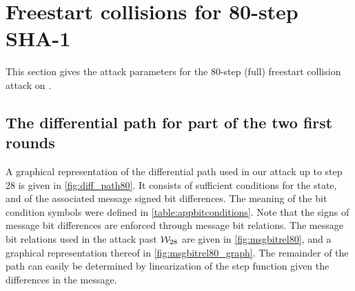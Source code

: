 \section{Freestart collisions for 80-step SHA-1}
\label{sec:res_80}

This section gives the attack parameters for the 80-step (full) freestart collision attack on \shaone.

\subsection{The differential path for part of the two first rounds}
\label{sec:app_diff_path80}

A graphical representation of the differential path
used in our attack up to step 28 is given in \autoref{fig:diff_path80}.
It consists of sufficient conditions for the state, and of the associated message signed bit differences.
The meaning of the bit condition symbols were defined in \autoref{table:appbitconditions}.
Note that the signs of message bit differences are enforced through message bit relations.
The message bit relations
used in the attack past $\mathcal{W}_{28}$ are given in \autoref{fig:msgbitrel80}, and a graphical
representation thereof in
\autoref{fig:msgbitrel80_graph}.
The remainder of the path can easily be determined by linearization of the step function given the differences
in the message.

